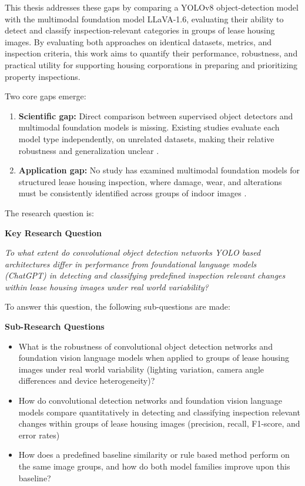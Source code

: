 This thesis addresses these gaps by comparing a YOLOv8 object-detection model with the multimodal foundation model LLaVA-1.6, evaluating their ability to detect and classify inspection-relevant categories in groups of lease housing images. By evaluating both approaches on identical datasets, metrics, and inspection criteria, this work aims to quantify their performance, robustness, and practical utility for supporting housing corporations in preparing and prioritizing property inspections.

Two core gaps emerge:
\begin{enumerate}
    \item \textbf{Scientific gap:} Direct comparison between supervised object detectors and multimodal foundation models is missing. Existing studies evaluate each model type independently, on unrelated datasets, making their relative robustness and generalization unclear \cite{jiang_mmad_2025, ni_towards_2026, wen_autonomous_2024}.
    \item \textbf{Application gap:} No study has examined multimodal foundation models for structured lease housing inspection, where damage, wear, and alterations must be consistently identified across groups of indoor images \cite{kang_improvement_2025}.
\end{enumerate}

The research question is:

\textbf{Key Research Question}

\emph{To what extent do convolutional object detection networks YOLO based architectures differ in performance from foundational language models (ChatGPT) in detecting and classifying predefined inspection relevant changes within lease housing images under real world variability?}

To answer this question, the following sub-questions are made:

\textbf{Sub-Research Questions}
\begin{itemize}
    \item What is the robustness of convolutional object detection networks and foundation vision language models when applied to groups of lease housing images under real world variability (lighting variation, camera angle differences and device heterogeneity)?
    \item How do convolutional detection networks and foundation vision language models compare quantitatively in detecting and classifying inspection relevant changes within groups of lease housing images (precision, recall, F1-score, and error rates) 
    \item How does a predefined baseline similarity or rule based method perform on the same image groups, and how do both model families improve upon this baseline?
\end{itemize}
